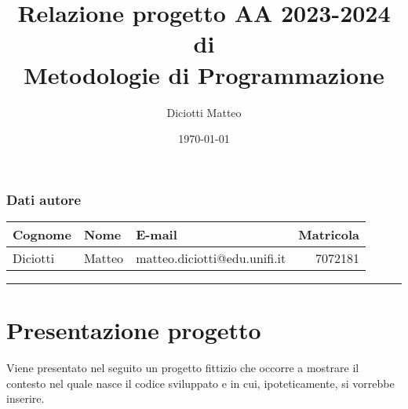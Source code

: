 \documentclass[a4paper,11pt]{article}
\author{Diciotti Matteo}
\title{Relazione progetto AA 2023-2024 di\\ \textbf{Metodologie di Programmazione}}
\date{\today}
\begin{document}
	
	\maketitle
	
	\subsubsection*{Dati autore}
	\begin{tabularx}{\textwidth}{l l >{\raggedleft\arraybackslash}X r}
		\textbf{Cognome} & \textbf{Nome} & \textbf{E-mail} & \textbf{Matricola}\\\toprule
		Diciotti & Matteo & matteo.diciotti@edu.unifi.it & 7072181
	\end{tabularx}
	
	\tableofcontents
	\vspace{1em}\noindent\rule{\textwidth}{2pt}
	
	\section{Presentazione progetto}
	Viene presentato nel seguito un progetto fittizio che occorre a mostrare il contesto nel quale nasce il codice sviluppato e in cui, ipoteticamente, si vorrebbe inserire.
\end{document}
